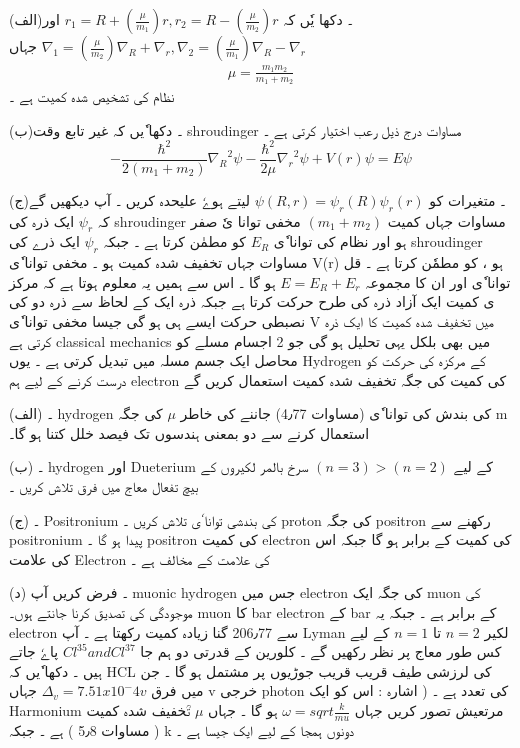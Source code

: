 (الف)۔  دکھا یٗں کہ 
$ r_1 = R + (\frac{ \mu}{m_1} )r , r_2 = R - (\frac{ \mu }{ m_2 } )r   $ 
اور 
$ \nabla_1 = ( \frac{ \mu }{ m_2 } )\nabla_R + \nabla_r , \nabla_2 = ( \frac{ \mu }{ m_1 } ) \nabla_R - \nabla_r $ 
جہاں 
\begin{align}
\mu = \frac{ m_1 m_2 }{ m_1 + m_2 }
\end{align}
نظام کی تشخیص شدہ کمیت ہے ۔
 
(ب)۔ دکھا ٗیں کہ غیر تابع وقت shroudinger  مساوات درج ذیل رعب اختیار کرتی ہے ۔
\[
- \frac{ \hbar^2 }{ 2 ( m_1 + m_2 ) } { \nabla_R }^2  \psi - \frac{ \hbar^2 }{ 2 \mu } { \nabla_r }^2 { \psi } + V(r) \psi = E \psi
\]

(ج)۔ متغیرات کو 
$ \psi ( R , r ) = { \psi_r }(R) { \psi_r } (r) $
لیتے ہوےٗ علیحدہ کریں ۔ آپ دیکھیں گے کہ 
$ \psi_r $
 ایک ذرہ کی shroudinger مساوات جہاں کمیت 
$ ( m_1 + m_2 ) $
مخفی توانا یٗ صفر ہو اور نظام کی توانا ٗی 
$ E_R $
کو مطمٰن کرتا ہے ۔ جبکہ 
$ \psi_r $
ایک ذرے کی shroudinger مساوات جہاں تخفیف شدہ کمیت ہو ۔  مخفی توانا ٗی  V(r) ہو ، کو مطمٗن کرتا ہے ۔ قل توانا ٗی اور ان کا مجموعہ 
$ E = E_R + E_r $
ہو گا ۔ اس سے ہمیں یہ معلوم ہوتا ہے  کہ مرکز ی کمیت ایک آزاد ذرہ کی طرح حرکت کرتا ہے جبکہ ذرہ ایک کے لحاظ سے ذرہ دو کی  نصبطی حرکت ایسے ہی ہو گی جیسا مخفی توانا ٗی V میں تخفیف شدہ کمیت کا ایک ذرہ  کرتی ہے classical mechanics میں بھی بلکل یہی تحلیل ہو گی    جو 2 اجسام مسلے کو محاصل ایک جسم مسلہ میں  تبدیل کرتی ہے ۔ 
 یوں Hydrogen کے مرکزہ کی حرکت کو درست کرنے کے لیے ہم electron  کی کمیت کی جگہ تخفیف شدہ کمیت استعمال کریں گے 

(الف) ۔ hydrogen کی بندش کی توانا ٗی (مساوات 4٫77) جاننے کی خاطر 
$ \mu $
کی جگہ m استعمال کرنے سے  دو بمعنی ہندسوں تک فیصد خلل کتنا ہو گا۔  

(ب) ۔ hydrogen اور Dueterium کے لیے 
$ ( n=3 ) > ( n=2 ) $ 
 سرخ بالمر لکیروں کے بیچ تفعال معاج میں فرق تلاش کریں ۔ 

(ج) ۔ Positronium کی بندشی توانا ٗی تلاش کریں ۔ proton کی جگہ  positron رکھنے سے positronium پیدا ہو گا ۔ positron کی کمیت electron کی کمیت کے برابر ہو گا جبکہ اس کی علامت Electron کی علامت کے مخالف ہے ۔ 

(د) ۔ فرض کریں آپ muonic hydrogen  جس میں electron کی جگہ ایک muon کی موجودگی کی تصدیق کرنا جانتے ہوں۔ muon کا bar  electron کے bar  کے برابر ہے ۔ جبکہ یہ electron سے 206٫77 گنا زیادہ  کمیت رکھتا ہے ۔  آپ Lyman    لکیر  
$ n = 2 $
تا 
$ n = 1 $
کے لیے کس طور معاج پر نظر رکھیں گے ۔ 
کلورین کے قدرتی دو ہم جا 
$ Cl^35 and Cl^37 $ 
پاےٗ جاتے ہیں ۔ دکھا ٗیں کہ HCL کی لرزشی طیف قریب قریب   جوڑیوں پر مشتمل ہو گا ۔ جن میں فرق 
$ \Delta_v = 7.51 x {10}^-4 v $
جہاں v خرجی photon کی تعدد ہے ۔  ( اشارہ : اس کو ایک Harmonium مرتعیش تصور کریں جہاں 
$ \omega = sqrt{ \frac{ k }{ mu} } $
ہو گا ۔ جہاں 
$ \mu $
تؒخفیف شدہ کمیت ( مساوات 5٫8 ) ہے ۔ جبکہ k دونوں ہمجا کے لیے ایک جیسا ہے ۔ 

